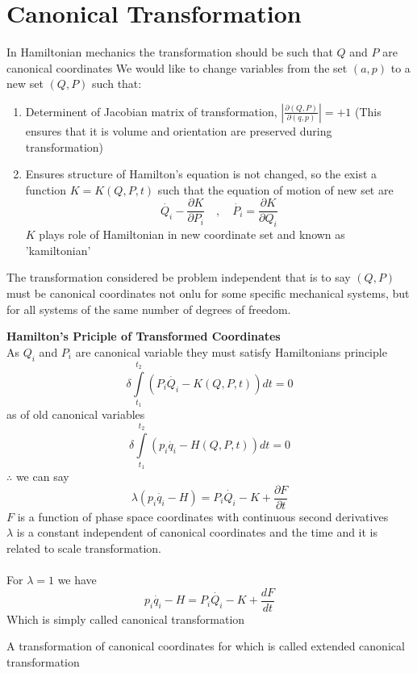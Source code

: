 \section{Canonical Transformation}
	 In Hamiltonian mechanics the transformation should be such that $Q$ and $P$ are canonical coordinates
	We would like to change variables from the set $(a,p)$ to a new set $(Q,P )$ such that:
	\begin{enumerate}
		\item  Determinent of Jacobian matrix of transformation, $\left| \frac{\partial(Q,P)}{\partial(q,p)}\right|=+1 $
		(This ensures that it is volume and orientation are preserved during transformation)
		\item  Ensures structure of Hamilton's equation is not changed, so the exist a function $K=K(Q,P,t)$ 
		such that the equation of motion of new set are	
		$$\dot{Q_i}-\frac{\partial K}{\partial P_i}\quad,\quad\dot{P_i}=\frac{\partial K}{\partial Q_i}$$
		$K$ plays role of Hamiltonian in new coordinate set and known as 'kamiltonian'	
	\end{enumerate}
\begin{note}
	The transformation considered be problem independent that is to say $(Q,P)$ must be canonical coordinates not onlu for some specific mechanical systems, but for all systems of the same number of degrees of freedom.	
\end{note}
\textbf{Hamilton's Priciple of Transformed Coordinates}\vspace{0.1cm}\\
 As $Q_i$ and $P_i$ are canonical variable they must satisfy Hamiltonians principle
\begin{equation}
\delta\int\limits_{t_1}^{t_2}(P_i\dot{Q_i}-K(Q,P,t))dt=0
\end{equation}
as of old canonical variables
\begin{equation}
\delta\int\limits_{t_1}^{t_2}(p_i\dot{q_i}-H(Q,P,t))dt=0
\end{equation}
$\therefore$ we can say
$$\lambda (p_i\dot{q_i}-H)=P_i\dot{Q_i}-K+\frac{\partial F}{\partial t}$$
$F$ is a function of phase space coordinates with continuous second derivatives \\
$\lambda$ is a constant independent of canonical coordinates and the time and it is related to scale transformation. \\\\
For $\lambda=1$ we have
$$p_i\dot{q_i}-H=P_i\dot{Q_i}-K+\frac{dF}{dt}$$
Which is simply called canonical transformation 
\begin{note}
	A transformation of canonical coordinates for which is called extended canonical transformation
\end{note}
